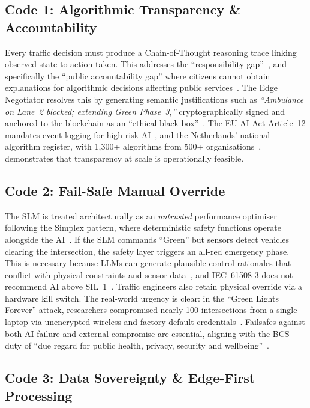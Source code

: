 \documentclass[sigconf,nonacm]{acmart}
\begin{document}
\subsection{Code 1: Algorithmic Transparency \& Accountability}

Every traffic decision must produce a Chain-of-Thought reasoning trace linking observed state to action taken. This addresses the ``responsibility gap''~\cite{matthias2004}, and specifically the ``public accountability gap'' where citizens cannot obtain explanations for algorithmic decisions affecting public services~\cite{santoni2021}. The Edge Negotiator resolves this by generating semantic justifications such as \textit{``Ambulance on Lane~2 blocked; extending Green Phase~3,''} cryptographically signed and anchored to the blockchain as an ``ethical black box''~\cite{winfield2017}. The EU AI Act Article~12 mandates event logging for high-risk AI~\cite{euaiact}, and the Netherlands' national algorithm register, with 1,300+ algorithms from 500+ organisations~\cite{algorithmregister}, demonstrates that transparency at scale is operationally feasible.

\subsection{Code 2: Fail-Safe Manual Override}

The SLM is treated architecturally as an \textit{untrusted} performance optimiser following the Simplex pattern, where deterministic safety functions operate alongside the AI~\cite{nesti2025}. If the SLM commands ``Green'' but sensors detect vehicles clearing the intersection, the safety layer triggers an all-red emergency phase. This is necessary because LLMs can generate plausible control rationales that conflict with physical constraints and sensor data~\cite{mowbray2026}, and IEC~61508-3 does not recommend AI above SIL~1~\cite{iec61508}. Traffic engineers also retain physical override via a hardware kill switch. The real-world urgency is clear: in the ``Green Lights Forever'' attack, researchers compromised nearly 100 intersections from a single laptop via unencrypted wireless and factory-default credentials~\cite{ghena2014}. Failsafes against both AI failure and external compromise are essential, aligning with the BCS duty of ``due regard for public health, privacy, security and wellbeing''~\cite{bcs}.

\subsection{Code 3: Data Sovereignty \& Edge-First Processing}
\end{document}
